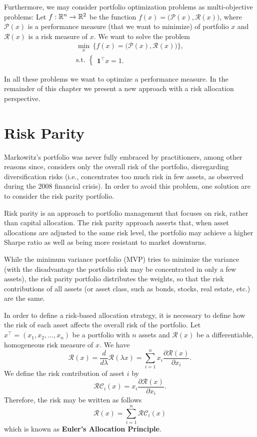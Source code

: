 Furthermore, we may consider portfolio optimization problems as multi-objective problems: Let $f:\mathbb{R}^n\to\mathbb{R}^2$ be the function $f(x)= \big(\mathcal{P}(x), \mathcal{R}(x)\big)$, where $\mathcal{P}(x)$ is a performance measure (that we want to minimize) of portfolio $x$ and $\mathcal{R}(x)$ is a risk measure of $x$. We want to solve the problem
\begin{eqnarray*}
	\min_{x} \,\Big\{f(x)= \big(\mathcal{P}(x), \mathcal{R}(x)\big)\Big\}, \\
	\mbox{s.t. }\left\{
	\begin{aligned}\nonumber
		\mathbf{1}^\top x=1.
	\end{aligned}
	\right.
\end{eqnarray*}

In all these problems we want to optimize a performance measure. In the remainder of this chapter we present a new approach with a risk allocation perspective.


\section{Risk Parity}

Markowitz’s portfolio was never fully embraced by practitioners, among other reasons since, considers only the overall risk of the portfolio, disregarding diversification risks (i.e., concentrates too much risk in few assets, as observed during the 2008 financial crisis). In order to avoid this problem, one solution are to consider the risk parity portfolio.

Risk parity is an approach to portfolio management that focuses on risk, rather than capital allocation. The risk parity approach asserts that, when asset allocations are adjusted to the same risk level, the portfolio may achieve a higher Sharpe ratio as well as being more resistant to market downturns.

While the minimum variance portfolio  (MVP) tries to minimize the variance (with the disadvantage the portfolio risk may be concentrated in only a few assets), the risk parity portfolio distributes the weights, so that the risk contributions of all assets (or asset class, such as bonds, stocks, real estate, etc.) are the same.

In order to define a risk-based allocation strategy, it is necessary to define how the risk of each asset affects the overall risk of the portfolio.
Let $x^\top=(x_1,x_2,\dots,x_n)$ be a portfolio with $n$ assets and $\mathcal{R}(x)$ be a differentiable, homogeneous risk measure of $x$. We have
\[
	\mathcal{R}(x)=\frac{d}{d\lambda}\mathcal{R}(\lambda x)=\sum_{i=1}^n x_i \frac{\partial \mathcal{R} (x)}{\partial x_i}.
\]
We define the risk contribution of asset $i$  by
\[
	\mathcal{RC}_i(x)= x_i \frac{\partial \mathcal{R}(x)}{\partial x_i}.
\]
Therefore, the risk may be written as follows
\[
	\mathcal{R}(x)=\sum_{i=1}^n \mathcal{RC}_i(x)
\]
which is known as \textbf{Euler's Allocation Principle}.

